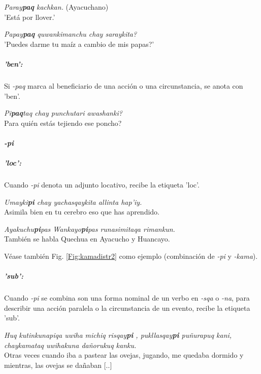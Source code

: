 \documentclass[a4paper,11pt,DIV12]{scrartcl}
\begin{document}
\begin{examples}
 \item \label{Ex:paqmod1} {\em Paray\textbf{paq} kachkan.} (Ayacuchano)\\
	 'Est\'a por llover.' \\
	 \hfill{\small \citep[64]{Dedenbach02}}
  \item \label{Ex:paqmod2} {\em Papay\textbf{paq} quwankimanchu chay saraykita?}\\
	 '{\textquestiondown}Puedes darme tu ma\'iz a cambio de mis papas?' \\
	 \hfill{\small \citep[128]{Cusi2}}
\end{examples}

\subparagraph{'ben':} 
Si {\em -paq} marca al beneficiario de una acci\'on o una circunstancia, se anota con 'ben'.
\begin{examples}
 \item {\em Pi\textbf{paq}taq chay punchutari awashanki?}\\
	{\textquestiondown}Para qui\'en est\'as tejiendo ese poncho?\\
	 \hfill{\small \citep[127]{Cusi2}}
\end{examples}


\paragraph{{\em -pi}}\label{Sec:pi}
\subparagraph{'loc':} Cuando {\em -pi} denota un adjunto locativo, recibe la etiqueta 'loc'. 
\begin{examples}
 \item {\em Umayki\textbf{pi} chay yachasqaykita allinta hap'iy.}\\
	Asimila bien en tu cerebro eso que has aprendido.
  \item {\em Ayakuchu\textbf{pi}pas Wankayo\textbf{pi}pas runasimitaqa rimankun.}\\
	Tambi\'en se habla Quechua en Ayacucho y Huancayo.\\
 \hfill {\small \citep[125]{Cusi2}}
\end{examples}

V\'ease tambi\'en Fig. \ref{Fig:kamadistr2} como ejemplo (combinaci\'on de {\em -pi} y {\em -kama}).


\subparagraph{'sub':}\label{Sec:pisub} Cuando {\em -pi} se combina son una forma nominal de un verbo en {\em -sqa} o {\em -na}, para describir una acci\'on paralela o la circunstancia de un evento, recibe la etiqueta 'sub'. 
\begin{examples}
 \item\label{Ex:pisub} {\em Huq kutinkunapiqa uwiha michiq risqay\textbf{pi} , pukllasqay\textbf{pi} puñurapuq kani, chaykamataq uwihakuna dañorukuq kanku.} \\
Otras veces cuando iba a pastear las ovejas, jugando, me quedaba dormido y mientras, las ovejas se dañaban [..]\\
 \hfill {\small \citep{Valderrama77}}
\end{examples}
\end{document}
